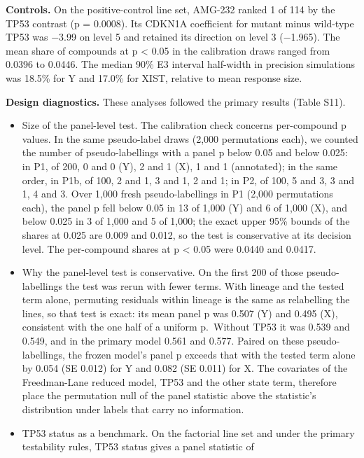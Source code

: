 \documentclass[
  11pt,
  letterpaper,
]{article}
\providecommand{\tightlist}{%
  \setlength{\itemsep}{0pt}\setlength{\parskip}{0pt}}
\begin{document}
\textbf{Controls.} On the positive-control line set, AMG-232 ranked 1 of
114 by the TP53 contrast (p = 0.0008). Its CDKN1A coefficient for mutant
minus wild-type TP53 was −3.99 on level 5 and retained its direction on
level 3 (−1.965). The mean share of compounds at p \textless{} 0.05 in
the calibration draws ranged from 0.0396 to 0.0446. The median 90\% E3
interval half-width in precision simulations was 18.5\% for Y and 17.0\%
for XIST, relative to mean response size.

\textbf{Design diagnostics.} These analyses followed the primary results
(Table S11).

\begin{itemize}
\tightlist
\item
  Size of the panel-level test. The calibration check concerns
  per-compound p values. In the same pseudo-label draws (2,000
  permutations each), we counted the number of pseudo-labellings with a
  panel p below 0.05 and below 0.025: in P1, of 200, 0 and 0 (Y), 2 and
  1 (X), 1 and 1 (annotated); in the same order, in P1b, of 100, 2 and
  1, 3 and 1, 2 and 1; in P2, of 100, 5 and 3, 3 and 1, 4 and 3. Over
  1,000 fresh pseudo-labellings in P1 (2,000 permutations each), the
  panel p fell below 0.05 in 13 of 1,000 (Y) and 6 of 1,000 (X), and
  below 0.025 in 3 of 1,000 and 5 of 1,000; the exact upper 95\% bounds
  of the shares at 0.025 are 0.009 and 0.012, so the test is
  conservative at its decision level. The per-compound shares at p
  \textless{} 0.05 were 0.0440 and 0.0417.
\item
  Why the panel-level test is conservative. On the first 200 of those
  pseudo-labellings the test was rerun with fewer terms. With lineage
  and the tested term alone, permuting residuals within lineage is the
  same as relabelling the lines, so that test is exact: its mean panel p
  was 0.507 (Y) and 0.495 (X), consistent with the one half of a uniform
  p.~Without TP53 it was 0.539 and 0.549, and in the primary model 0.561
  and 0.577. Paired on these pseudo-labellings, the frozen model's panel
  p exceeds that with the tested term alone by 0.054 (SE 0.012) for Y
  and 0.082 (SE 0.011) for X. The covariates of the Freedman-Lane
  reduced model, TP53 and the other state term, therefore place the
  permutation null of the panel statistic above the statistic's
  distribution under labels that carry no information.
\item
  TP53 status as a benchmark. On the factorial line set and under the
  primary testability rules, TP53 status gives a panel statistic of

\end{itemize}
\end{document}
